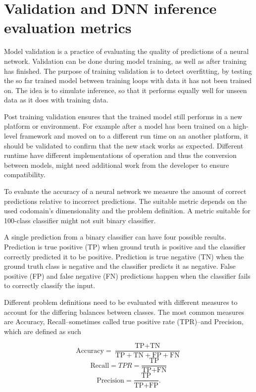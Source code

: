 \documentclass[12pt,a4paper,english
]{tunithesis}
\begin{document}
\section{Validation and DNN inference evaluation metrics}
Model validation is a practice of evaluating the quality of predictions of a neural network. Validation can be done during model training, as well as after training has finished. The purpose of training validation is to detect overfitting, by testing the so far trained model between training loops with data it has not been trained on. The idea is to simulate inference, so that it performs equally well for unseen data as it does with training data.

Post training validation ensures that the trained model still performs in a new platform or environment. For example after a model has been trained on a high-level framework and moved on to a different run time on an another platform, it should be validated to confirm that the new stack works as expected. Different runtime have different implementations of operation and thus the conversion between models, might need additional work from the developer to ensure compatibility.

To evaluate the accuracy of a neural network we measure the amount of correct predictions relative to incorrect predictions. The suitable metric depends on the used codomain's dimensionality and the problem definition. A metric suitable for 100-class classifier might not suit binary classifier.

A single prediction from a binary classifier can have four possible results. Prediction is true positive (TP) when ground truth is positive and the classifier correctly predicted it to be positive. Prediction is true negative (TN) when the ground truth class is negative and the classifier predicts it as negative. False positive (FP) and false negative (FN) predictions happen when the classifier fails to correctly classify the input.

Different problem definitions need to be evaluated with different measures to account for the differing balances between classes. The most common measures are Accuracy, Recall--sometimes called true positive rate (TPR)--and Precision, which are defined as such

\begin{equation}
\text{Accuracy} =  \frac{\text{TP} + \text{TN}}{\text{TP} + \text{TN} + \text{FP} + \text{FN}}
\end{equation}
\begin{equation}
\text{Recall} = TPR = \frac{\text{TP}}{\text{TP} + \text{FN}}
\end{equation}
\begin{equation}
\text{Precision} =  \frac{\text{TP}}{\text{TP} + \text{FP}}.
\end{equation}
\end{document}
